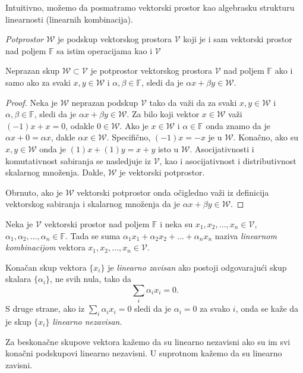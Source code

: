 \documentclass{article}
\begin{document}
Intuitivno, možemo da posmatramo vektorski prostor kao algebrasku strukturu linearnosti (linearnih kombinacija).

\begin{definition}
  \textit{Potprostor} $\mathcal{W}$ je podskup vektorskog prostora $\mathcal{V}$ koji je i sam vektorski prostor nad poljem $\mathbb{F}$ sa istim operacijama kao i $\mathcal{V}$
\end{definition}

\begin{theorem}
  Neprazan skup $\mathcal{W} \subset \mathcal{V}$ je potprostor vektorskog prostora $\mathcal{V}$ nad poljem $\mathbb{F}$ ako i samo ako za svaki $x, y \in \mathcal{W}$ i $\alpha, \beta \in \mathbb{F}$, sledi da je $\alpha x + \beta y \in \mathcal{W}$.
\end{theorem}

\begin{proof}
  Neka je $\mathcal{W}$ neprazan podskup $\mathcal{V}$ tako da važi da za svaki $x, y \in \mathcal{W}$ i $\alpha, \beta \in \mathbb{F}$, sledi da je $\alpha x + \beta y \in \mathcal{W}$.
  Za bilo koji vektor $x \in \mathcal{W}$ važi $(-1) x + x = 0$, odakle $0 \in \mathcal{W}$.
  Ako je $x \in \mathcal{W}$ i $\alpha \in \mathbb{F}$ onda znamo da je $\alpha x + 0 = \alpha x$, dakle $\alpha x \in \mathcal{W}$.
  Specifično, $(-1) x = -x$ je u $\mathcal{W}$.
  Konačno, ako su $x, y \in \mathcal{W}$ onda je $(1) x + (1) y = x + y$ isto u $\mathcal{W}$.
  Asocijativnosti i komutativnost sabiranja se nasledjuje iz $\mathcal{V}$, kao i asocijativnost i distributivnost skalarnog množenja.
  Dakle, $\mathcal{W}$ je vektorski potprostor.

  Obrnuto, ako je $\mathcal{W}$ vektorski potprostor onda očigledno važi iz definicija vektorskog sabiranja i skalarnog množenja da je $\alpha x + \beta y \in \mathcal{W}$.
\end{proof}

\begin{definition}
  Neka je $\mathcal{V}$ vektorski prostor nad poljem $\mathbb{F}$ i neka su $x_1, x_2, \ldots, x_n \in \mathcal{V}$, $\alpha_1, \alpha_2, \ldots, \alpha_n \in \mathbb{F}$.
  Tada se suma $\alpha_1 x_1 + \alpha_2 x_2 + \ldots + \alpha_n x_n$ naziva \textit{linearnom kombinacijom} vektora $x_1, x_2, \ldots, x_n \in \mathcal{V}$.
\end{definition}

\begin{definition}
  Konačan skup vektora $\{x_i\}$ je \textit{linearno zavisan} ako postoji odgovarajući skup skalara $\{\alpha_i\}$, ne svih nula, tako da
  \[\sum_{i} \alpha_i x_i = 0.\]
  S druge strane, ako iz $\sum_{i} \alpha_i x_i = 0$ sledi da je $\alpha_i = 0$ za svako $i$, onda se kaže da je skup $\{x_i\}$ \textit{linearno nezavisan}.
  
  Za beskonačne skupove vektora kažemo da su linearno nezavisni ako su im svi konačni podskupovi linearno nezavisni.
  U suprotnom kažemo da su linearno zavisni.
\end{definition}
\end{document}
